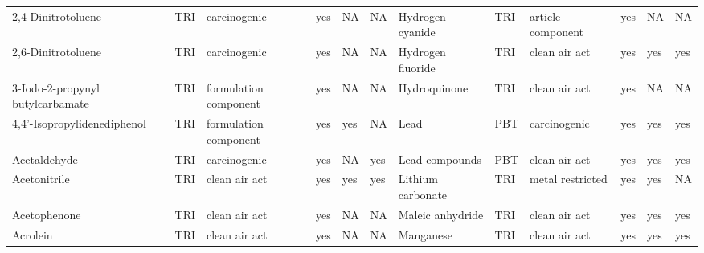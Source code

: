 \begin{table}[H]
{\begin{tabular}{llllllllllll}
            2,4-Dinitrotoluene                                                         & TRI            & carcinogenic          & yes    & NA      & NA   & Hydrogen cyanide                                                                                                   & TRI            & article component & yes & NA & NA\\
            2,6-Dinitrotoluene                                                         & TRI            & carcinogenic          & yes    & NA      & NA   & Hydrogen fluoride                                                                                                  & TRI            & clean air act & yes & yes & yes\\
            3-Iodo-2-propynyl butylcarbamate                                           & TRI            & formulation component & yes    & NA      & NA   & Hydroquinone & TRI & clean air act & yes & NA & NA\\
            4,4'-Isopropylidenediphenol                                                & TRI            & formulation component & yes    & yes     & NA   & Lead                                                                                                               & PBT            & carcinogenic & yes & yes & yes\\
            Acetaldehyde                                                               & TRI            & carcinogenic          & yes    & NA      & yes  & Lead compounds                                                                                                     & PBT            & clean air act         & yes    & yes & yes\\
            Acetonitrile                                                               & TRI            & clean air act         & yes    & yes     & yes  & Lithium carbonate                                                                                                  & TRI            & metal restricted & yes & yes & NA\\
            Acetophenone                                                               & TRI            & clean air act         & yes    & NA      & NA   & Maleic anhydride                                                                                                   & TRI            & clean air act         & yes    & yes & yes\\
            Acrolein                                                                   & TRI            & clean air act         & yes    & NA      & NA   & Manganese                                                                                                          & TRI            & clean air act         & yes    & yes     & yes  \\

\end{tabular}}
\end{table}
